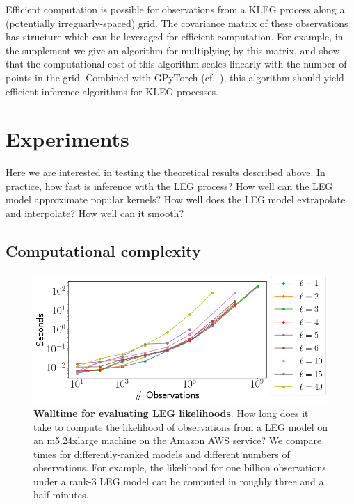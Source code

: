 \documentclass{article}
\theoremstyle{definition}
\begin{document}
Efficient computation is possible for observations from a KLEG process along a (potentially irreguarly-spaced) grid.  The covariance matrix of these observations has structure which can be leveraged for efficient computation.  For example, in the supplement we give an algorithm for multiplying by this matrix, and show that the computational cost of this algorithm scales linearly with the number of points in the grid.  Combined with GPyTorch (cf.\ \cite{gardner2018gpytorch}), this algorithm should yield efficient inference algorithms for KLEG processes.





\section{Experiments}

Here we are interested in testing the theoretical results described above.  In practice, how fast is inference with the LEG process?  How well can the LEG model approximate popular kernels?  How well does the LEG model extrapolate and interpolate?  How well can it smooth?

\subsection{Computational complexity}

\begin{figure}[t!]
\vskip 0.2in
\begin{center}
\centerline{\includegraphics[width=\columnwidth]{pics/scaling}}
\caption{\textbf{Walltime for evaluating LEG likelihoods}.  How long does it take to compute the likelihood of observations from a LEG model on an m5.24xlarge machine on the Amazon AWS service?   We compare times for differently-ranked models and different numbers of observations.   For example, the likelihood for one billion observations under a rank-3 LEG model can be computed in roughly three and a half minutes.  
\label{fig:sofast}}
\end{center}
\vskip -0.2in
\end{figure}
\end{document}

